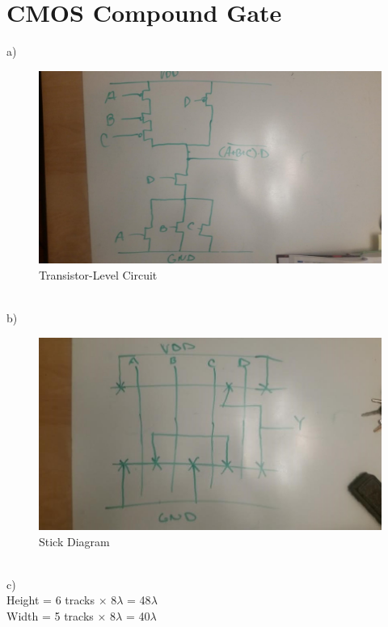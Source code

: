 \documentclass[11pt]{article}
\begin{document}
\section{CMOS Compound Gate}
a)
\begin{figure}[H]
\centering
\includegraphics[width=0.9\linewidth]{compound-cmos}
\caption{Transistor-Level Circuit}
\label{fig:compound-cmos}
\end{figure}
~\\
b)
\begin{figure}[H]
\centering
\includegraphics[width=0.9\linewidth]{compound-stick}
\caption{Stick Diagram}
\label{fig:compound-stick}
\end{figure}
~\\
c)\\ 
\indent Height = 6 tracks $\times$ 8$\lambda$ = 48$\lambda$\\
\indent Width = 5 tracks $\times$ 8$\lambda$ = 40$\lambda$
\end{document}
